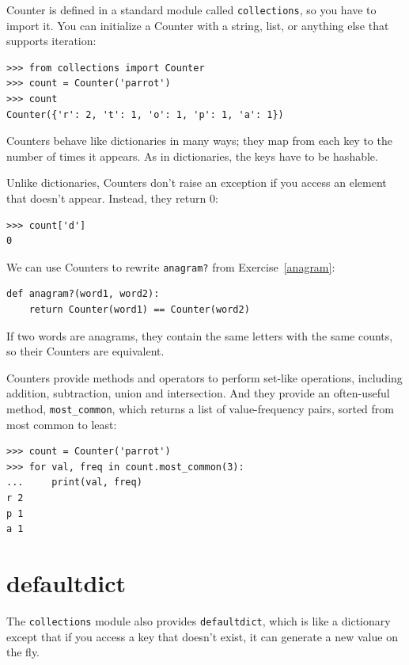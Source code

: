 \documentclass[10pt]{book}
\begin{document}
Counter is defined in a standard module called {\tt collections},
so you have to import it.  You can initialize a Counter with a string,
list, or anything else that supports iteration:

\begin{verbatim}
>>> from collections import Counter
>>> count = Counter('parrot')
>>> count
Counter({'r': 2, 't': 1, 'o': 1, 'p': 1, 'a': 1})
\end{verbatim}

Counters behave like dictionaries in many ways; they map from each
key to the number of times it appears.  As in dictionaries,
the keys have to be hashable.

Unlike dictionaries, Counters don't raise an exception if you access
an element that doesn't appear.  Instead, they return 0:

\begin{verbatim}
>>> count['d']
0
\end{verbatim}

We can use Counters to rewrite \verb"anagram?" from
Exercise~\ref{anagram}:

\begin{verbatim}
def anagram?(word1, word2):
    return Counter(word1) == Counter(word2)
\end{verbatim}

If two words are anagrams, they contain the same letters with the same
counts, so their Counters are equivalent.

Counters provide methods and operators to perform set-like operations,
including addition, subtraction, union and intersection.  And
they provide an often-useful method, \verb"most_common", which
returns a list of value-frequency pairs, sorted from most common to
least:

\begin{verbatim}
>>> count = Counter('parrot')
>>> for val, freq in count.most_common(3):
...     print(val, freq)
r 2
p 1
a 1
\end{verbatim}


\section{defaultdict}

The {\tt collections} module also provides {\tt defaultdict}, which is
like a dictionary except that if you access a key that doesn't exist,
it can generate a new value on the fly.
\end{document}
